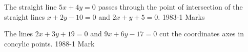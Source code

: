 \iffalse
\title{Straight Lines and Pair of Straight Lines}
\author{EE24BTECH11041 - Mohit}
\section {true-false}
\fi
    \item The straight line $5x+4y=0$ passes through the point of intersection of the straight lines $x+2y-10=0$ and $2x+y+5=0$.
    \hfill{1983-1 Marks}
    \item The lines $2x+3y+19=0$ and $9x+6y-17=0$ cut the coordinates axes in concylic points.
    \hfill{1988-1 Mark}


